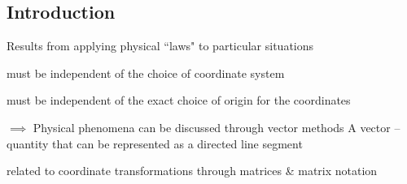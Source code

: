 \documentclass[../main.tex]{subfiles}
\begin{document}
    \subsection{Introduction}
    Results from applying physical ``laws" to particular situations
    \begin{dasheditemize}
        \item must be independent of the choice of coordinate system
        \item must be independent of the exact choice of origin for the coordinates
    \end{dasheditemize}
    $\implies$ Physical phenomena can be discussed through vector methods
    \blankline
    A vector -- quantity that can be represented as a directed line segment
    \begin{dasheditemize}
        \item related to coordinate transformations through matrices \& matrix notation
    \end{dasheditemize}
\end{document}

